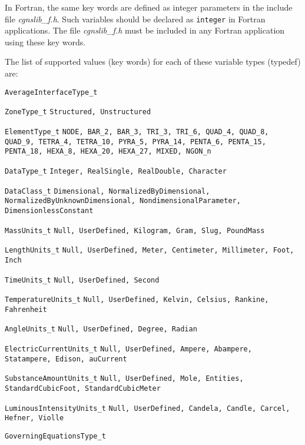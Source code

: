 In Fortran, the same key words are defined as integer parameters in the
include file \textit{cgnslib\_f.h}.
Such variables should be declared as \texttt{integer} in Fortran
applications.
The file \textit{cgnslib\_f.h} must be included in any
Fortran application using these key words.

The list of supported values (key words) for each of these variable
types (typedef) are:
        
{\raggedright
\begin{Ventryi}{\texttt{AverageInterfaceType\_t}}
   \item [\texttt{ZoneType\_t}]
         \texttt{Structured, Unstructured}
   \item [\texttt{ElementType\_t}]
         \texttt{NODE, BAR\_2, BAR\_3, TRI\_3, TRI\_6, QUAD\_4,
         QUAD\_8, QUAD\_9, TETRA\_4, TETRA\_10, PYRA\_5,
         PYRA\_14, PENTA\_6, PENTA\_15, PENTA\_18, HEXA\_8,
         HEXA\_20, HEXA\_27, MIXED, NGON\_n}
   \item [\texttt{DataType\_t}]
         \texttt{Integer, RealSingle, RealDouble, Character}
   \item [\texttt{DataClass\_t}]
         \texttt{Dimensional, NormalizedByDimensional,
         NormalizedByUnknownDimensional, NondimensionalParameter,
         DimensionlessConstant}
   \item [\texttt{MassUnits\_t}]
         \texttt{Null, UserDefined, Kilogram, Gram, Slug, PoundMass}
   \item [\texttt{LengthUnits\_t}]
         \texttt{Null, UserDefined, Meter, Centimeter, Millimeter, Foot,
         Inch}
   \item [\texttt{TimeUnits\_t}]
         \texttt{Null, UserDefined, Second}
   \item [\texttt{TemperatureUnits\_t}]
         \texttt{Null, UserDefined, Kelvin, Celsius, Rankine,
         Fahrenheit}
   \item [\texttt{AngleUnits\_t}]
         \texttt{Null, UserDefined, Degree, Radian}
   \item [\texttt{ElectricCurrentUnits\_t}]
         \texttt{Null, UserDefined, Ampere, Abampere, Statampere, Edison,
         auCurrent}
   \item [\texttt{SubstanceAmountUnits\_t}]
         \texttt{Null, UserDefined, Mole, Entities, StandardCubicFoot,
         StandardCubicMeter}
   \item [\texttt{LuminousIntensityUnits\_t}]
         \texttt{Null, UserDefined, Candela, Candle, Carcel, Hefner, Violle}
   \item [\texttt{GoverningEquationsType\_t}]

\end{Ventryi}}
